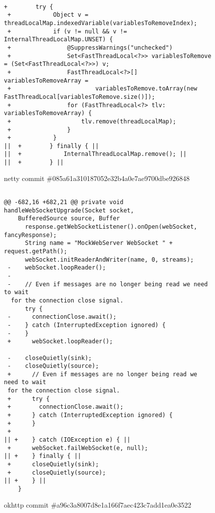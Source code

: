 \begin{figure*}
\begin{lstlisting}[moredelim={[is][\color{red}]{||}{||}}]

+        try {
 +            Object v = threadLocalMap.indexedVariable(variablesToRemoveIndex);
 +            if (v != null && v != InternalThreadLocalMap.UNSET) {
 +                @SuppressWarnings("unchecked")
 +                Set<FastThreadLocal<?>> variablesToRemove = (Set<FastThreadLocal<?>>) v;
 +                FastThreadLocal<?>[] variablesToRemoveArray =
 +                        variablesToRemove.toArray(new FastThreadLocal[variablesToRemove.size()]);
 +                for (FastThreadLocal<?> tlv: variablesToRemoveArray) {
 +                    tlv.remove(threadLocalMap);
 +                }
 +            }
||  +        } finally { || 
||  +            InternalThreadLocalMap.remove(); ||
||  +        } ||
 \end{lstlisting}
\caption{netty commit \#085a61a310187052e32b4a0e7ae9700dbe926848\label{fig:thread1}}
\end{figure*}


\begin{figure*}
\begin{lstlisting}[moredelim={[is][\color{red}]{||}{||}}]

@@ -682,16 +682,21 @@ private void handleWebSocketUpgrade(Socket socket, 
    BufferedSource source, Buffer
      response.getWebSocketListener().onOpen(webSocket, fancyResponse);
      String name = "MockWebServer WebSocket " + request.getPath();
      webSocket.initReaderAndWriter(name, 0, streams);
 -    webSocket.loopReader();
 -
 -    // Even if messages are no longer being read we need to wait
  for the connection close signal.
      try {
 -      connectionClose.await();
 -    } catch (InterruptedException ignored) {
 -    }
 +      webSocket.loopReader();
  
 -    closeQuietly(sink);
 -    closeQuietly(source);
 +      // Even if messages are no longer being read we need to wait 
 for the connection close signal.
 +      try {
 +        connectionClose.await();
 +      } catch (InterruptedException ignored) {
 +      }
 +
|| +    } catch (IOException e) { ||
 +      webSocket.failWebSocket(e, null); 
|| +    } finally { || 
 +      closeQuietly(sink);
 +      closeQuietly(source);
|| +    } ||
    }
\end{lstlisting}
\caption{okhttp commit \#a96c3a8007d8e1a166f7aec423c7add1ea0e3522\label{fig:thread2}}
\end{figure*}


